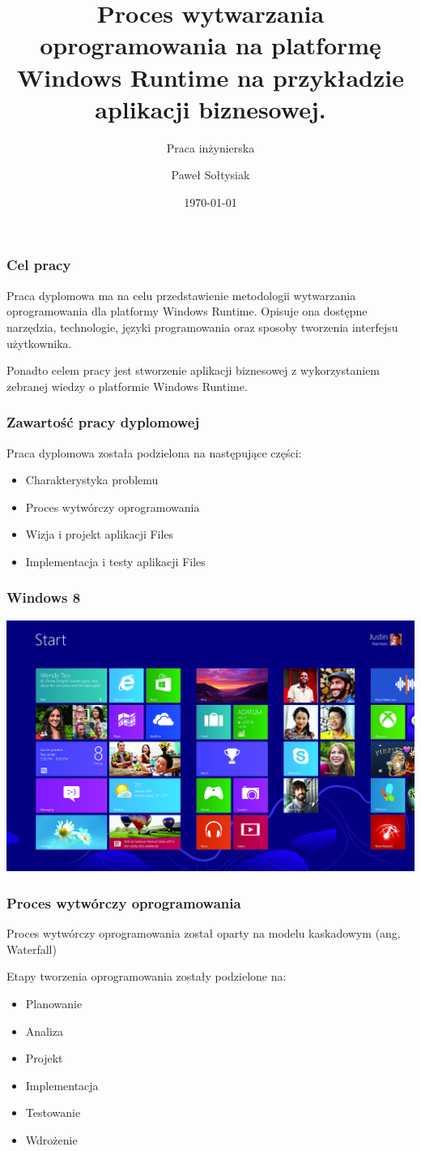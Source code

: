 \documentclass{beamer}
\title{Proces wytwarzania oprogramowania na platformę Windows Runtime na przykładzie aplikacji biznesowej.}
\subtitle{Praca inżynierska}
\author{Paweł Sołtysiak}
\institute{Promotor pracy: dr inż.  Witold Maćków\\Recenzent pracy:dr inż. Piotr Błaszyński}
\date{\today}
\begin{document}
\begin{frame}
\titlepage
\end{frame} 


\begin{frame}
\frametitle{Cel pracy} 
Praca dyplomowa ma na celu przedstawienie metodologii wytwarzania oprogramowania dla platformy Windows Runtime. Opisuje ona dostępne narzędzia, technologie, języki programowania oraz sposoby tworzenia interfejsu użytkownika.

Ponadto celem pracy jest stworzenie aplikacji biznesowej z wykorzystaniem zebranej wiedzy o platformie Windows Runtime.
\end{frame}


\begin{frame}
\frametitle{Zawartość pracy dyplomowej}
Praca dyplomowa została podzielona na następujące części:
\begin{itemize}[<+->]
\item Charakterystyka problemu
\item Proces wytwórczy oprogramowania
\item Wizja i projekt aplikacji Files
\item Implementacja i testy aplikacji Files
\end{itemize}
\end{frame}

\begin{frame}
\frametitle{Windows 8}
 \includegraphics[width=\textwidth]{images/windows-8.jpg}
\end{frame}

\begin{frame}
\frametitle{Proces wytwórczy oprogramowania}
Proces wytwórczy oprogramowania został oparty na modelu kaskadowym (ang. Waterfall)

Etapy tworzenia oprogramowania zostały podzielone na:
\begin{itemize}[<+->]
\item Planowanie 
\item Analiza
\item Projekt
\item Implementacja 
\item Testowanie 
\item Wdrożenie
\end{itemize}
\end{frame}
\end{document}
